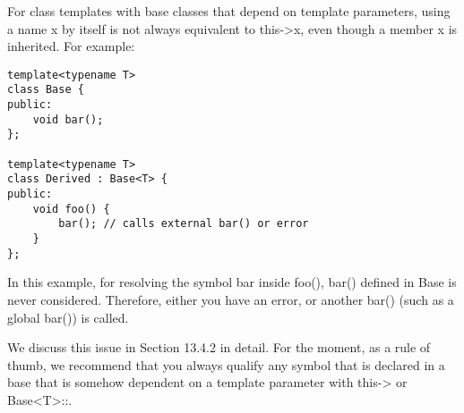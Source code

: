 For class templates with base classes that depend on template parameters, using a name x by itself is not always equivalent to this->x, even though a member x is inherited. For example:

\begin{lstlisting}[style=styleCXX]
template<typename T>
class Base {
public:
	void bar();
};

template<typename T>
class Derived : Base<T> {
public:
	void foo() {
		bar(); // calls external bar() or error
	}
};
\end{lstlisting}

In this example, for resolving the symbol bar inside foo(), bar() defined in Base is never considered. Therefore, either you have an error, or another bar() (such as a global bar()) is called.

We discuss this issue in Section 13.4.2 in detail. For the moment, as a rule of thumb, we recommend that you always qualify any symbol that is declared in a base that is somehow dependent on a template parameter with this-> or Base<T>::.














































